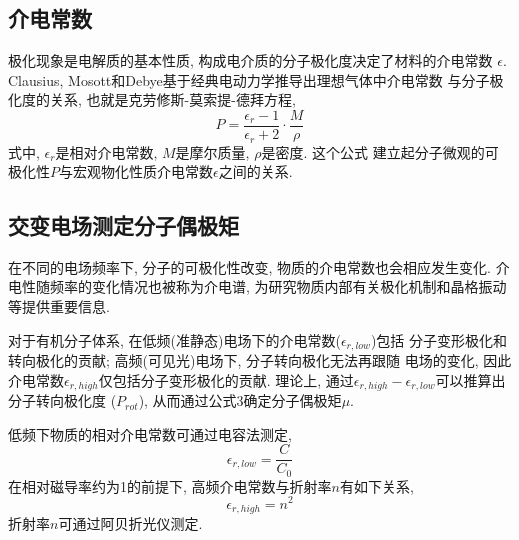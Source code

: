 \documentclass[a4paper]{article}
\begin{document}
\subsection{介电常数}
极化现象是电解质的基本性质, 构成电介质的分子极化度决定了材料的介电常数
$\epsilon$. Clausius, Mosott和Debye基于经典电动力学推导出理想气体中介电常数
与分子极化度的关系, 也就是克劳修斯-莫索提-德拜方程,
\begin{equation}
	P = \frac{\epsilon_{r}-1}{\epsilon_{r}+2}\cdot \frac{M}{\rho}
\end{equation}
式中, $\epsilon_{r}$是相对介电常数, $M$是摩尔质量, $\rho$是密度. 这个公式
建立起分子微观的可极化性$P$与宏观物化性质介电常数$\epsilon$之间的关系.
\par
\subsection{交变电场测定分子偶极矩}
在不同的电场频率下, 分子的可极化性改变, 物质的介电常数也会相应发生变化.
介电性随频率的变化情况也被称为介电谱, 为研究物质内部有关极化机制和晶格振动
等提供重要信息.
\par
对于有机分子体系, 在低频(准静态)电场下的介电常数($\epsilon_{r, low}$)包括
分子变形极化和转向极化的贡献; 高频(可见光)电场下, 分子转向极化无法再跟随
电场的变化, 因此介电常数$\epsilon_{r, high}$仅包括分子变形极化的贡献. 
理论上, 通过$\epsilon_{r, high} - \epsilon_{r, low}$可以推算出分子转向极化度
($P_{rot}$), 从而通过公式3确定分子偶极矩$\mu$.
\par
低频下物质的相对介电常数可通过电容法测定, 
\begin{equation}
	\epsilon_{r, low} = \frac{C}{C_{0}}
\end{equation}
在相对磁导率约为1的前提下, 高频介电常数与折射率$n$有如下关系,
\begin{equation}
	\epsilon_{r, high} = n^{2}
\end{equation}
折射率$n$可通过阿贝折光仪测定.
\end{document}
